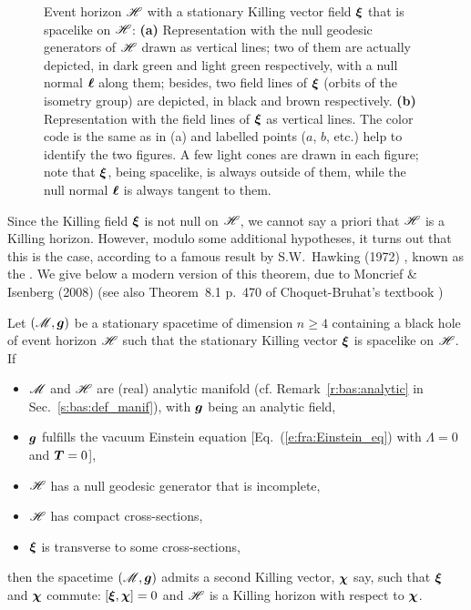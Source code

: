 \begin{figure}
\caption[]{\label{f:sta:rot_horizon} \footnotesize
Event horizon $\mathscr{H}$ with a stationary Killing vector field $\bm{\xi}$ that is
spacelike on $\mathscr{H}$:
\textbf{(a)} Representation with the null geodesic generators of $\mathscr{H}$ drawn as vertical
lines; two of them are actually depicted, in dark green and light green
respectively, with a null normal $\bm{\ell}$ along them; besides,
two field lines of $\bm{\xi}$
(orbits of the isometry group) are depicted, in black and brown
respectively.
\textbf{(b)} Representation with the field lines of $\bm{\xi}$ as vertical lines.
The color code is the same as in (a) and
labelled points ($a$, $b$, etc.) help to identify
the two figures. A few light cones are drawn in each figure; note that $\bm{\xi}$,
being spacelike,
is always outside of them,
while the null normal $\bm{\ell}$ is always tangent to them. }
\end{figure}

Since the Killing field $\bm{\xi}$ is not null on $\mathscr{H}$, we cannot say a priori
that $\mathscr{H}$ is a Killing horizon. However, modulo some additional hypotheses,
it turns out that this is the case, according to a famous result by
S.W.~Hawking (1972)
\cite{Hawki72,HawkiE73}, known as the
.
We give below a modern version of this theorem, due to Moncrief \& Isenberg
(2008) \cite{MoncrI08} (see also
Theorem~8.1 p.~470 of Choquet-Bruhat's textbook \cite{Choqu09})
\begin{prop}
\label{p:sta:strong_rigidity_thm}
Let $(\mathscr{M},\bm{g})$ be a stationary spacetime of dimension $n\geq 4$ containing a black
hole of event horizon $\mathscr{H}$ such that the stationary Killing vector $\bm{\xi}$
is spacelike on $\mathscr{H}$. If
\begin{itemize}
\item $\mathscr{M}$ and $\mathscr{H}$ are (real) analytic manifold
(cf. Remark~\ref{r:bas:analytic} in Sec.~\ref{s:bas:def_manif}),
with $\bm{g}$ being an analytic field,
\item $\bm{g}$ fulfills the vacuum Einstein equation
[Eq.~(\ref{e:fra:Einstein_eq}) with $\Lambda=0$ and $\bm{T} = 0$],
\item $\mathscr{H}$ has a null geodesic generator that is incomplete,
\item $\mathscr{H}$ has compact cross-sections,
\item $\bm{\xi}$ is transverse to some cross-sections,
\end{itemize}
then the spacetime $(\mathscr{M},\bm{g})$ admits a second Killing vector, $\bm{\chi}$
say, such that $\bm{\xi}$ and $\bm{\chi}$ commute: $[\bm{\xi}, \bm{\chi}] = 0$ and
$\mathscr{H}$ is a Killing horizon with respect to $\bm{\chi}$.
\end{prop}

